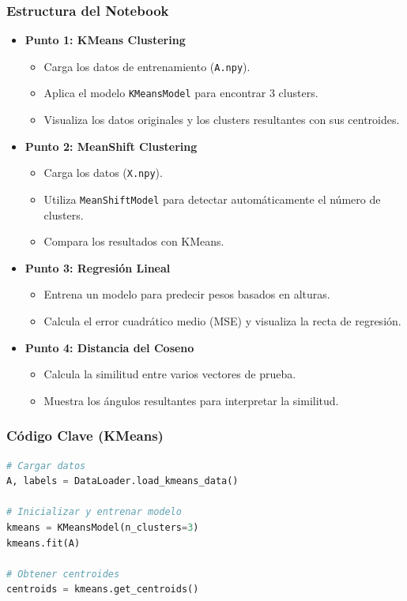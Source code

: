 \documentclass[12pt, a4paper]{article}
\begin{document}
\subsubsection{Estructura del Notebook}
\begin{itemize}
    \item \textbf{Punto 1: KMeans Clustering}
    \begin{itemize}
        \item Carga los datos de entrenamiento (\texttt{A.npy}).
        \item Aplica el modelo \texttt{KMeansModel} para encontrar 3 clusters.
        \item Visualiza los datos originales y los clusters resultantes con sus centroides.
    \end{itemize}
    \item \textbf{Punto 2: MeanShift Clustering}
    \begin{itemize}
        \item Carga los datos (\texttt{X.npy}).
        \item Utiliza \texttt{MeanShiftModel} para detectar automáticamente el número de clusters.
        \item Compara los resultados con KMeans.
    \end{itemize}
    \item \textbf{Punto 3: Regresión Lineal}
    \begin{itemize}
        \item Entrena un modelo para predecir pesos basados en alturas.
        \item Calcula el error cuadrático medio (MSE) y visualiza la recta de regresión.
    \end{itemize}
    \item \textbf{Punto 4: Distancia del Coseno}
    \begin{itemize}
        \item Calcula la similitud entre varios vectores de prueba.
        \item Muestra los ángulos resultantes para interpretar la similitud.
    \end{itemize}
\end{itemize}

\subsubsection{Código Clave (KMeans)}
\begin{lstlisting}[language=Python]
# Cargar datos
A, labels = DataLoader.load_kmeans_data()

# Inicializar y entrenar modelo
kmeans = KMeansModel(n_clusters=3)
kmeans.fit(A)

# Obtener centroides
centroids = kmeans.get_centroids()
\end{lstlisting}
\end{document}
